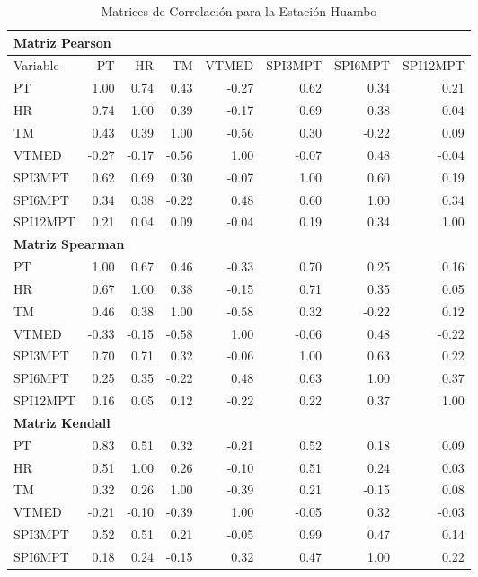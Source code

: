 \begin{table}[ht]
\centering
\caption{Matrices de Correlación para la Estación Huambo}
\begin{tabular}{lrrrrrrr}
\toprule
\multicolumn{8}{l}{\textbf{Matriz Pearson}} \\
\midrule
Variable & PT & HR & TM & VTMED & SPI3MPT & SPI6MPT & SPI12MPT \\
\midrule
PT       & 1.00 & 0.74 & 0.43 & -0.27 & 0.62 & 0.34 & 0.21 \\
HR       & 0.74 & 1.00 & 0.39 & -0.17 & 0.69 & 0.38 & 0.04 \\
TM       & 0.43 & 0.39 & 1.00 & -0.56 & 0.30 & -0.22 & 0.09 \\
VTMED    & -0.27 & -0.17 & -0.56 & 1.00 & -0.07 & 0.48 & -0.04 \\
SPI3MPT  & 0.62 & 0.69 & 0.30 & -0.07 & 1.00 & 0.60 & 0.19 \\
SPI6MPT  & 0.34 & 0.38 & -0.22 & 0.48 & 0.60 & 1.00 & 0.34 \\
SPI12MPT & 0.21 & 0.04 & 0.09 & -0.04 & 0.19 & 0.34 & 1.00 \\
\midrule
\multicolumn{8}{l}{\textbf{Matriz Spearman}} \\
\midrule
PT       & 1.00 & 0.67 & 0.46 & -0.33 & 0.70 & 0.25 & 0.16 \\
HR       & 0.67 & 1.00 & 0.38 & -0.15 & 0.71 & 0.35 & 0.05 \\
TM       & 0.46 & 0.38 & 1.00 & -0.58 & 0.32 & -0.22 & 0.12 \\
VTMED    & -0.33 & -0.15 & -0.58 & 1.00 & -0.06 & 0.48 & -0.22 \\
SPI3MPT  & 0.70 & 0.71 & 0.32 & -0.06 & 1.00 & 0.63 & 0.22 \\
SPI6MPT  & 0.25 & 0.35 & -0.22 & 0.48 & 0.63 & 1.00 & 0.37 \\
SPI12MPT & 0.16 & 0.05 & 0.12 & -0.22 & 0.22 & 0.37 & 1.00 \\
\midrule
\multicolumn{8}{l}{\textbf{Matriz Kendall}} \\
\midrule
PT       & 0.83 & 0.51 & 0.32 & -0.21 & 0.52 & 0.18 & 0.09 \\
HR       & 0.51 & 1.00 & 0.26 & -0.10 & 0.51 & 0.24 & 0.03 \\
TM       & 0.32 & 0.26 & 1.00 & -0.39 & 0.21 & -0.15 & 0.08 \\
VTMED    & -0.21 & -0.10 & -0.39 & 1.00 & -0.05 & 0.32 & -0.03 \\
SPI3MPT  & 0.52 & 0.51 & 0.21 & -0.05 & 0.99 & 0.47 & 0.14 \\
SPI6MPT  & 0.18 & 0.24 & -0.15 & 0.32 & 0.47 & 1.00 & 0.22 \\

\end{tabular}
\end{table}
